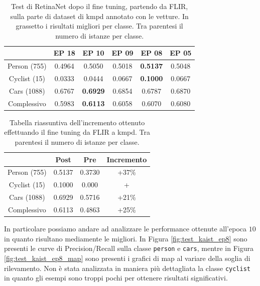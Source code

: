 \begin{table}[]
    \centering
    \begin{tabular}{c|c|c|c|c|c|}
    \cline{2-6}
     & EP 18 & EP 10 & EP 09 & EP 08 & EP 05 \\ \hline
    \multicolumn{1}{|c|}{Person (755)} & 0.4964 & 0.5050 & 0.5018 & \textbf{0.5137} & 0.5048 \\ \hline
    \multicolumn{1}{|c|}{Cyclist (15)} & 0.0333 & 0.0444 & 0.0667 & \textbf{0.1000} & 0.0667 \\ \hline
    \multicolumn{1}{|c|}{Cars (1088)} & 0.6767 & \textbf{0.6929} & 0.6854 & 0.6787 & 0.6870 \\ \hline
    \multicolumn{1}{|c|}{Complessivo} & 0.5983 & \textbf{0.6113} & 0.6058 & 0.6070 & 0.6080 \\ \hline
    \end{tabular}
    \caption{Test di RetinaNet dopo il fine tuning, partendo da FLIR, sulla parte di dataset di \ac{kmpd} annotato con le vetture. In grassetto i risultati migliori per classe. Tra parentesi il numero di istanze per classe.}
    \label{tab:fine_tuning_kaist_flir}
\end{table}
\begin{table}[]
    \centering
    \begin{tabular}{c|c|c|c|}
    \cline{2-4}
     & Post & Pre & Incremento \\ \hline
    \multicolumn{1}{|c|}{Person (755)} & 0.5137 & 0.3730 & +37\% \\ \hline
    \multicolumn{1}{|c|}{Cyclist (15)} & 0.1000 & 0.000 & + \\ \hline
    \multicolumn{1}{|c|}{Cars (1088)} & 0.6929 & 0.5716 & +21\% \\ \hline
    \multicolumn{1}{|c|}{Complessivo} & 0.6113 & 0.4863 & +25\% \\ \hline
    \end{tabular}
    \caption{Tabella riassuntiva dell'incremento ottenuto effettuando il fine tuning da FLIR a \ac{kmpd}. Tra parentesi il numero di istanze per classe. }
    \label{tab:fine_tuning_kaist_flir_increment}
\end{table}

In particolare possiamo andare ad analizzare le performance ottenute all'epoca $10$ in quanto risultano mediamente le migliori. In Figura \ref{fig:test_kaist_ep8} sono presenti le curve di Precision/Recall sulla classe \texttt{person} e \texttt{cars}, mentre in Figura \ref{fig:test_kaist_ep8_map} sono presenti i grafici di \ac{map} al variare della soglia di rilevamento. Non è stata analizzata in maniera più dettagliata la classe \texttt{cyclist} in quanto gli esempi sono troppi pochi per ottenere risultati significativi. 

